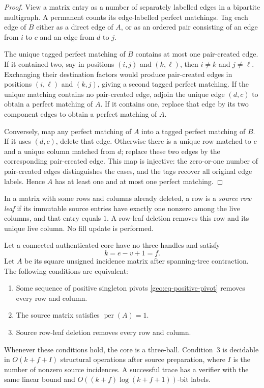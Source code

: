 \begin{proof}
View a matrix entry as a number of separately labelled edges in a
bipartite multigraph.  A permanent counts its edge-labelled perfect
matchings.  Tag each edge of $B$ either as a direct edge of $A$, or as an
ordered pair consisting of an edge from $i$ to $c$ and an edge from $d$ to
$j$.

The unique tagged perfect matching of $B$ contains at most one pair-created
edge.  If it contained two, say in positions $(i,j)$ and $(k,\ell)$, then
$i\ne k$ and $j\ne\ell$.  Exchanging their destination factors would
produce pair-created edges in positions $(i,\ell)$ and $(k,j)$, giving a
second tagged perfect matching.  If the unique matching contains no
pair-created edge, adjoin the unique edge $(d,c)$ to obtain a perfect
matching of $A$.  If it contains one, replace that edge by its two
component edges to obtain a perfect matching of $A$.

Conversely, map any perfect matching of $A$ into a tagged perfect matching
of $B$.  If it uses $(d,c)$, delete that edge.  Otherwise there is a unique
row matched to $c$ and a unique column matched from $d$; replace these two
edges by the corresponding pair-created edge.  This map is injective:
the zero-or-one number of pair-created edges distinguishes the cases, and
the tags recover all original edge labels.  Hence $A$ has at least one and
at most one perfect matching.
\end{proof}

\begin{definition}
\label{geo:def-leaf}
In a matrix with some rows and columns already deleted, a row is a
\emph{source row leaf} if its immutable source entries have exactly one
nonzero among the live columns, and that entry equals $1$.  A row-leaf
deletion removes this row and its unique live column.  No fill update is
performed.
\end{definition}

\begin{theorem}
\label{geo:thm-ball-closure}
Let a connected authenticated core have no three-handles and satisfy
\[
 k=e-v+1=f.
\]
Let $A$ be its square unsigned incidence matrix after spanning-tree
contraction.  The following conditions are equivalent:
\begin{enumerate}
\item Some sequence of positive singleton pivots
      \eqref{geo:eq-positive-pivot} removes every row and column.
\item The source matrix satisfies $\operatorname{per}(A)=1$.
\item Source row-leaf deletion removes every row and column.
\end{enumerate}
Whenever these conditions hold, the core is a three-ball.  Condition~3 is
decidable in $O(k+f+I)$ structural operations after source preparation,
where $I$ is the number of nonzero source incidences.  A successful trace
has a verifier with the same linear bound and
$O((k+f)\log(k+f+1))$-bit labels.
\end{theorem}

